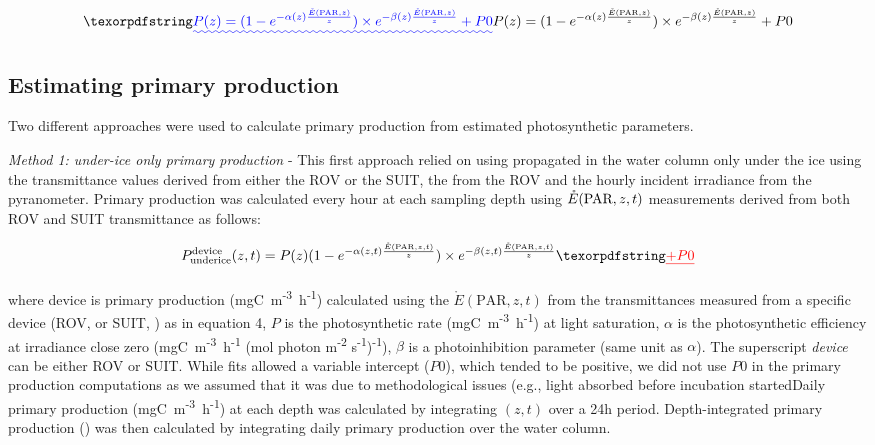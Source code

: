 \begin{linenomath*}
	\begin{equation}
\DIFadd{P(z) = (1 - e^{-\alpha(z)\frac{\mathring{E}(\text{PAR}, z)}{z}}) \times e^{-\beta(z)\frac{\mathring{E}(\text{PAR}, z)}{z}} + P0
}\end{equation}
\end{linenomath*}
\DIFaddend 



\subsection{Estimating primary production}

Two different approaches were used to calculate primary production from estimated photosynthetic parameters.

\textit{Method 1: under-ice only primary production} - This first approach relied on using \eparscalar{} propagated in the water column only under the ice using the transmittance values derived from either the ROV or the SUIT, the \kdparscalar{} from the ROV and the hourly incident irradiance from the pyranometer. Primary production was calculated every hour at each sampling depth using $\mathring{E}(\textnormal{PAR}, z, t)$ measurements derived from both ROV and SUIT transmittance as follows:

\begin{linenomath*}
    \begin{equation}
		\ppundericedevice{}(z,t) = P(z)(1 - e^{-\alpha(z,t)\frac{\mathring{E}(\text{PAR}, z, t)}{z}}) \times e^{-\beta(z,t)\frac{\mathring{E}(\text{PAR}, z, t)}{z}}
	\DIFdelbegin \DIFdel{+ P0
	}\DIFdelend \end{equation}
\end{linenomath*}

\noindent where \ppundericedevice{} device is primary production (mgC~m\textsuperscript{-3}~h\textsuperscript{-1}) calculated using the $\mathring{E}(\text{PAR}, z, t)$ from the transmittances measured from a specific device (ROV, \pprovunderice{} or SUIT, \ppsuitunderice{}) as in equation 4, $P$ is the photosynthetic rate (mgC~m\textsuperscript{-3}~h\textsuperscript{-1}) at light saturation, $\alpha$ is the photosynthetic efficiency at irradiance close zero (mgC~m\textsuperscript{-3}~h\textsuperscript{-1} (\textmu mol photon m\textsuperscript{-2} s\textsuperscript{-1})\textsuperscript{-1}), $\beta$ is a photoinhibition parameter (same unit as $\alpha$). The superscript \textit{device} can be either ROV or SUIT. While fits allowed a variable intercept ($P0$), which tended to be positive, we did not use $P0$ in the primary production computations as we assumed that it was due to methodological issues (e.g., light absorbed before incubation started\DIFdelbegin {}\DIFdelend \DIFaddbegin {}\DIFaddend Daily primary production (mgC~m\textsuperscript{-3}~h\textsuperscript{-1}) at each depth was calculated by integrating \ppundericedevice{}$(z,t)$ over a 24h period. Depth-integrated primary production (\dailypp{}) was then calculated by integrating daily primary production over the \DIFaddbegin {}\DIFaddend water column.

